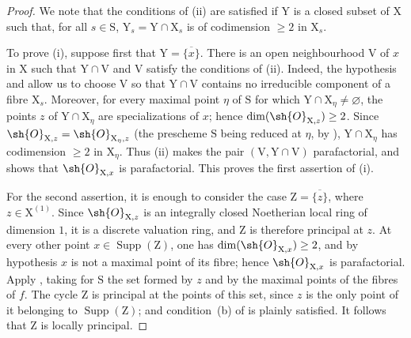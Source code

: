 \begin{proof}
We note that the conditions of (ii) are satisfied if $\mathrm{Y}$ is a closed subset of $\mathrm{X}$ such that, for all $s\in\mathrm{S}$, $\mathrm{Y}_s=\mathrm{Y}\cap\mathrm{X}_s$ is of codimension $\geq 2$ in $\mathrm{X}_s$.

To prove (i), suppose first that $\mathrm{Y}=\overline{\{x\}}$. There is an open neighbourhood $\mathrm{V}$ of $x$ in $\mathrm{X}$ such that $\mathrm{Y}\cap\mathrm{V}$ and $\mathrm{V}$ satisfy the conditions of (ii). Indeed, the hypothesis and  allow us to choose $\mathrm{V}$ so that $\mathrm{Y}\cap\mathrm{V}$ contains no irreducible component of a fibre $\mathrm{X}_s$. Moreover, for every maximal point $\eta$ of $\mathrm{S}$ for which $\mathrm{Y}\cap\mathrm{X}_\eta\neq\varnothing$, the points $z$ of $\mathrm{Y}\cap\mathrm{X}_\eta$ are specializations of $x$; hence $\dim(\sh{O}_{\mathrm{X},z})\geq2$. Since $\sh{O}_{\mathrm{X},z}=\sh{O}_{\mathrm{X}_\eta,z}$ (the prescheme $\mathrm{S}$ being reduced at $\eta$, by ), $\mathrm{Y}\cap\mathrm{X}_\eta$ has codimension $\geq2$ in $\mathrm{X}_\eta$. Thus (ii) makes the pair $(\mathrm{V},\mathrm{Y}\cap\mathrm{V})$ parafactorial, and  shows that $\sh{O}_{\mathrm{X},x}$ is parafactorial. This proves the first assertion of (i).

For the second assertion, it is enough to consider the case $\mathrm{Z}=\overline{\{z\}}$, where $z\in\mathrm{X}^{(1)}$. Since $\sh{O}_{\mathrm{X},z}$ is an integrally closed Noetherian local ring of dimension $1$, it is a discrete valuation ring, and $\mathrm{Z}$ is therefore principal at $z$. At every other point $x\in\operatorname{Supp}(\mathrm{Z})$, one has $\dim(\sh{O}_{\mathrm{X},x})\geq2$, and by hypothesis $x$ is not a maximal point of its fibre; hence $\sh{O}_{\mathrm{X},x}$ is parafactorial. Apply , taking for $\mathrm{S}$ the set formed by $z$ and by the maximal points of the fibres of $f$. The cycle $\mathrm{Z}$ is principal at the points of this set, since $z$ is the only point of it belonging to $\operatorname{Supp}(\mathrm{Z})$; and condition~(b) of  is plainly satisfied. It follows that $\mathrm{Z}$ is locally principal.


\end{proof}
